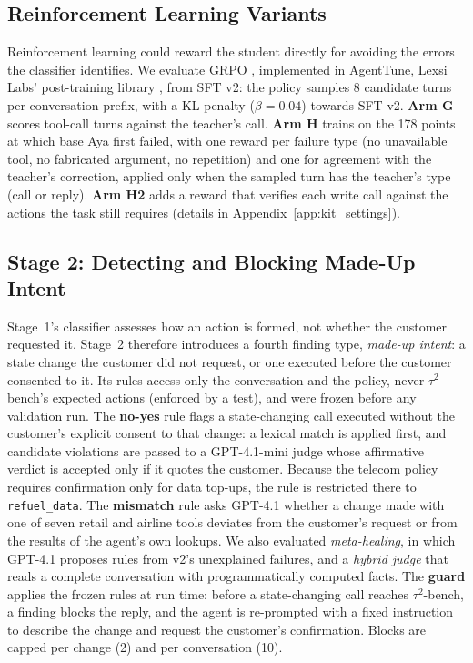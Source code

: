 \documentclass[11pt]{article}
\begin{document}
\subsection{Reinforcement Learning Variants}
\label{sec:method_grpo}
Reinforcement learning could reward the student directly for avoiding the errors the classifier identifies. We evaluate GRPO \citep{Shao2024DeepSeekMath}, implemented in AgentTune, Lexsi Labs' post-training library \citep{Lyngkhoi2026AgentTune}, from SFT v2: the policy samples 8 candidate turns per conversation prefix, with a KL penalty ($\beta=0.04$) towards SFT v2. \textbf{Arm G} scores tool-call turns against the teacher's call. \textbf{Arm H} trains on the 178 points at which base Aya first failed, with one reward per failure type (no unavailable tool, no fabricated argument, no repetition) and one for agreement with the teacher's correction, applied only when the sampled turn has the teacher's type (call or reply). \textbf{Arm H2} adds a reward that verifies each write call against the actions the task still requires (details in Appendix~\ref{app:kit_settings}).

\subsection{Stage 2: Detecting and Blocking Made-Up Intent}
\label{sec:method_stage2}
Stage~1's classifier assesses how an action is formed, not whether the customer requested it. Stage~2 therefore introduces a fourth finding type, \emph{made-up intent}: a state change the customer did not request, or one executed before the customer consented to it. Its rules access only the conversation and the policy, never $\tau^2$-bench's expected actions (enforced by a test), and were frozen before any validation run. The \textbf{no-yes} rule flags a state-changing call executed without the customer's explicit consent to that change: a lexical match is applied first, and candidate violations are passed to a GPT-4.1-mini judge whose affirmative verdict is accepted only if it quotes the customer. Because the telecom policy requires confirmation only for data top-ups, the rule is restricted there to \texttt{refuel\_data}. The \textbf{mismatch} rule asks GPT-4.1 whether a change made with one of seven retail and airline tools deviates from the customer's request or from the results of the agent's own lookups. We also evaluated \emph{meta-healing}, in which GPT-4.1 proposes rules from v2's unexplained failures, and a \emph{hybrid judge} that reads a complete conversation with programmatically computed facts. The \textbf{guard} applies the frozen rules at run time: before a state-changing call reaches $\tau^2$-bench, a finding blocks the reply, and the agent is re-prompted with a fixed instruction to describe the change and request the customer's confirmation. Blocks are capped per change (2) and per conversation (10).
\end{document}
